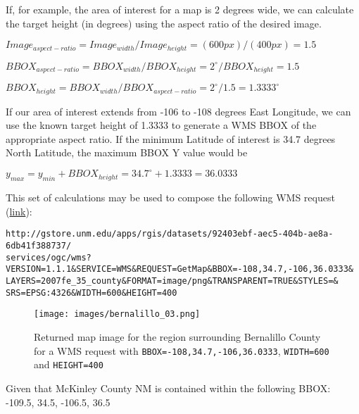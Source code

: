 \documentclass[]{book}
\begin{document}
If, for example, the area of interest for a map is 2 degrees wide, we
can calculate the target height (in degrees) using the aspect ratio of
the desired image.

\(Image_{aspect-ratio} = Image_{width} / Image_{height} = (600px) / (400px) = 1.5\)

\(BBOX_{aspect-ratio} = BBOX_{width} / BBOX_{height} = 2^{\circ} / BBOX_{height} = 1.5\)

\(BBOX_{height} = BBOX_{width} / BBOX_{aspect-ratio} = 2^{\circ} / 1.5 = 1.3333^{\circ}\)

If our area of interest extends from -106 to -108 degrees East
Longitude, we can use the known target height of 1.3333 to generate a
WMS BBOX of the appropriate aspect ratio. If the minimum Latitude of
interest is 34.7 degrees North Latitude, the maximum BBOX Y value would
be

\(y_{max} = y_{min} + BBOX_{height} = 34.7^{\circ} + 1.3333 = 36.0333\)

This set of calculations may be used to compose the following WMS
request
(\href{http://gstore.unm.edu/apps/rgis/datasets/92403ebf-aec5-404b-ae8a-6db41f388737/services/ogc/wms?VERSION=1.1.1\&SERVICE=WMS\&REQUEST=GetMap\&BBOX=-108,34.7,-106,36.0333\&LAYERS=g_2007fe_35_county\&FORMAT=image/png\&TRANSPARENT=TRUE\&STYLES=\&SRS=EPSG:4326\&WIDTH=600\&HEIGHT=400}{link}):

\begin{verbatim}
http://gstore.unm.edu/apps/rgis/datasets/92403ebf-aec5-404b-ae8a-6db41f388737/
services/ogc/wms?VERSION=1.1.1&SERVICE=WMS&REQUEST=GetMap&BBOX=-108,34.7,-106,36.0333&
LAYERS=2007fe_35_county&FORMAT=image/png&TRANSPARENT=TRUE&STYLES=&
SRS=EPSG:4326&WIDTH=600&HEIGHT=400
\end{verbatim}

\begin{figure}[htbp]
\centering
\texttt{[image: images/bernalillo\_03.png]}
\caption{Returned map image for the region surrounding Bernalillo County
for a WMS request with \texttt{BBOX=-108,34.7,-106,36.0333},
\texttt{WIDTH=600} and \texttt{HEIGHT=400}}
\end{figure}

Given that McKinley County NM is contained within the following BBOX:
-109.5, 34.5, -106.5, 36.5
\end{document}
